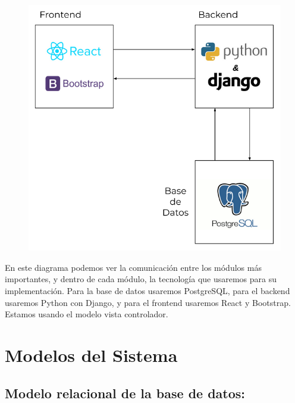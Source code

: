 \documentclass[12pt]{article}
\newcounter{ni}
\begin{document}
\begin{figure}[H]
\centering
\includegraphics[scale=0.7]{Arquitectura.png}
\end{figure}

En este diagrama podemos ver la comunicación entre los módulos más importantes, y dentro de cada módulo, la tecnología que usaremos para su implementación. Para la base de datos usaremos PostgreSQL, para el backend usaremos Python con Django, y para el frontend usaremos React y Bootstrap. 
Estamos usando el modelo vista controlador.


\section{Modelos del Sistema}

\subsection{Modelo relacional de la base de datos:}
\end{document}
